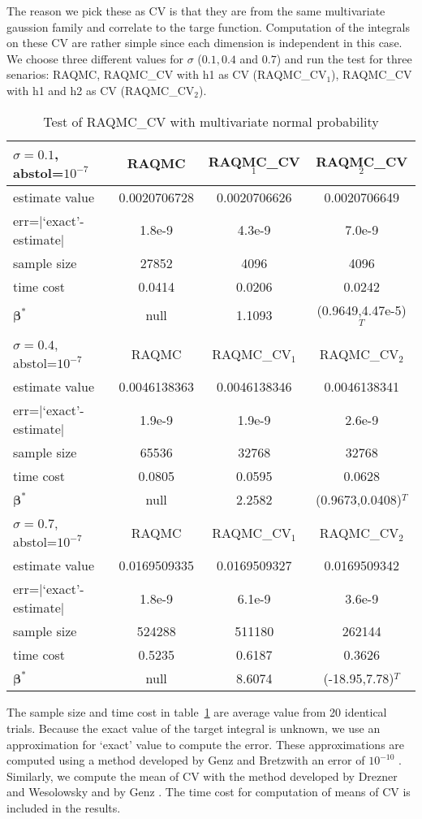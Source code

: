 The reason we pick these as CV is that they are from the same multivariate gaussion family and correlate to the targe function. 
Computation of the integrals on these CV are rather simple since each dimension is independent in this case. 
We choose three different values for $\sigma$ ($0.1, 0.4$ and $0.7$) and run the test for three senarios: RAQMC, RAQMC\_CV with h1 as CV (RAQMC\_CV$_1$), RAQMC\_CV with h1 and h2 as CV (RAQMC\_CV$_2$). 
\begin{table}[h]
    \centering
	\caption{Test of RAQMC\_CV with multivariate normal probability}
    \label{tb:mvntest}
    \begin{tabular}{lccc}  
    \hline \hline
    $\sigma=0.1$, abstol=$10^{-7}$ &RAQMC&RAQMC\_CV$_1$&RAQMC\_CV$_2$\\[0.5ex]
    \hline
    estimate value& 0.0020706728& 0.0020706626&0.0020706649\\[0.5ex]
    err=$|$`exact'-estimate$|$ & 1.8e-9&4.3e-9&7.0e-9\\[0.5ex]
    sample size& 27852& 4096&4096\\[0.5ex]
    time cost& 0.0414& 0.0206&0.0242\\[0.5ex]
    $\boldsymbol{\beta}^*$& null&1.1093 & (0.9649,4.47e-5)$^T$\\[0.5ex]
    \hline
    $\sigma=0.4$, abstol=$10^{-7}$ &RAQMC&RAQMC\_CV$_1$&RAQMC\_CV$_2$\\[0.5ex]
    \hline
    estimate value& 0.0046138363& 0.0046138346&0.0046138341\\[0.5ex]
    err=$|$`exact'-estimate$|$ & 1.9e-9& 1.9e-9&2.6e-9\\[0.5ex]
    sample size& 65536& 32768&32768\\[0.5ex]
    time cost& 0.0805&0.0595&0.0628\\[0.5ex]
    $\boldsymbol{\beta}^*$& null&2.2582 & (0.9673,0.0408)$^T$\\[0.5ex]
    \hline
    $\sigma=0.7$, abstol=$10^{-7}$& RAQMC&RAQMC\_CV$_1$&RAQMC\_CV$_2$\\[0.5ex]
    \hline
    estimate value&0.0169509335 & 0.0169509327&0.0169509342\\[0.5ex]
    err=$|$`exact'-estimate$|$ & 1.8e-9& 6.1e-9&3.6e-9\\[0.5ex]
    sample size& 524288& 511180&262144\\[0.5ex]
    time cost& 0.5235& 0.6187&0.3626\\[0.5ex]
    $\boldsymbol{\beta}^*$& null&8.6074 &(-18.95,7.78)$^T$\\[0.5ex]
    \hline
    \end{tabular}
\end{table}
The sample size and time cost in table~\ref{tb:mvntest} are average value from 20 identical trials. 
Because the exact value of the target integral is unknown, we use an approximation for `exact' value to compute the error. 
These approximations are computed using a method developed by Genz and Bretzwith an error of $10^{-10}$ \cite{genz1992numerical}. 
Similarly, we compute the mean of CV with the method developed by Drezner and Wesolowsky and by Genz \cite{drezner1978computation}\cite{genz2004numerical}. The time cost for computation of means of CV is included in the results.  

